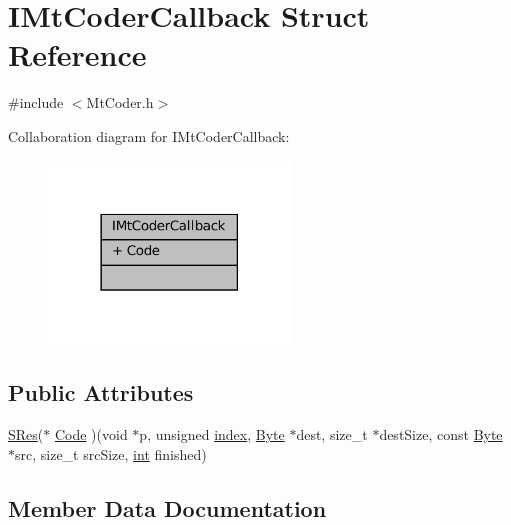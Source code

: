 \hypertarget{struct_i_mt_coder_callback}{}\section{I\+Mt\+Coder\+Callback Struct Reference}
\label{struct_i_mt_coder_callback}


{\ttfamily \#include $<$Mt\+Coder.\+h$>$}



Collaboration diagram for I\+Mt\+Coder\+Callback\+:
\nopagebreak
\begin{figure}[H]
\begin{center}
\leavevmode
\includegraphics[width=182pt]{struct_i_mt_coder_callback__coll__graph}
\end{center}
\end{figure}
\subsection*{Public Attributes}
\begin{DoxyCompactItemize}
\item 
\mbox{\hyperlink{7z_types_8h_acc0053eeb62726b68b22e8c7d9e91367}{S\+Res}}($\ast$ \mbox{\hyperlink{struct_i_mt_coder_callback_aae037e6c34536e9c7e66e074113ad3cc}{Code}} )(void $\ast$p, unsigned \mbox{\hyperlink{isa-lr35902_8c_ac9ee548085af12859cb52a6c757cf73a}{index}}, \mbox{\hyperlink{7z_types_8h_ae3a497195d617519e5353ea7b417940f}{Byte}} $\ast$dest, size\+\_\+t $\ast$dest\+Size, const \mbox{\hyperlink{7z_types_8h_ae3a497195d617519e5353ea7b417940f}{Byte}} $\ast$src, size\+\_\+t src\+Size, \mbox{\hyperlink{ioapi_8h_a787fa3cf048117ba7123753c1e74fcd6}{int}} finished)
\end{DoxyCompactItemize}


\subsection{Member Data Documentation}
\mbox{\label{struct_i_mt_coder_callback_aae037e6c34536e9c7e66e074113ad3cc}} 
